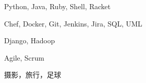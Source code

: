 \documentclass{newresume}
\begin{document}
\begin{description}[style=nextline,leftmargin=3em,topsep=1pt]
	\item[语言] Python, Java, Ruby, Shell, Racket
	\item[工具] Chef, Docker, Git, Jenkins, Jira, SQL, UML
	\item[框架] Django, Hadoop
	\item[方法] Agile, Scrum
\end{description}





%




\begin{body}
	摄影，旅行，足球
\end{body}
\end{document}
